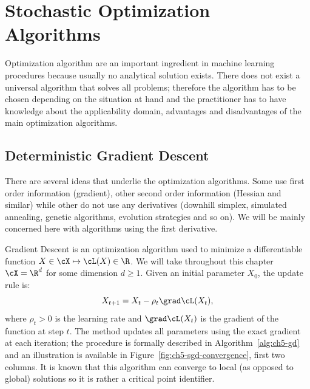 \chapter{Stochastic Optimization Algorithms}
\label{chap:stoch-optim}

Optimization algorithm are an important ingredient in machine learning procedures because usually no analytical solution exists. There does not exist a universal algorithm that solves all problems; therefore the algorithm has to be chosen depending on the situation at hand and the practitioner has to have knowledge about the applicability domain, advantages and disadvantages of the main optimization algorithms.

\section{Deterministic Gradient Descent}
\label{sec:ch5-deterministic-gd}

There are several ideas that underlie the optimization algorithms. Some use first order information (gradient), other second order information (Hessian and similar) while other do not use any derivatives (downhill simplex, simulated annealing, genetic algorithms, evolution strategies and so on). We will be mainly concerned here with algorithms using the first derivative.

Gradient Descent is an optimization algorithm used to minimize a differentiable function $X \in \cX \mapsto \cL(X) \in \R$. We will take throughout this chapter $\cX = \R^d$ for some dimension $d \geq 1$. Given an initial parameter $X_0$, the update rule is:
\begin{equation}\label{eq:ch5-gd-update}
X_{t+1} = X_t - \rho_t \grad \cL(X_t),
\end{equation}
where $\rho_t > 0$ is the learning rate and $\grad \cL(X_t)$ is the gradient of the function at step $t$. The method updates all parameters using the exact gradient at each iteration; the procedure is formally described in Algorithm~\ref{alg:ch5-gd} and an illustration is available in Figure~\ref{fig:ch5-sgd-convergence}, first two columns. It is known that this algorithm can converge to local (as opposed to global) solutions so it is rather a critical point identifier.

